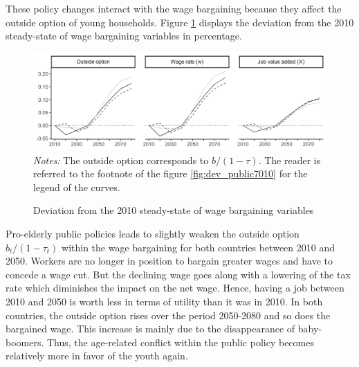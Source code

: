 These policy changes interact with the wage bargaining because they affect the outside option of young households. Figure \ref{fig:dev_bargain1080} displays the deviation from the 2010 steady-state of wage bargaining variables in percentage.
\begin{figure}[!b]
	\centering
	\caption{Deviation from the 2010 steady-state of wage bargaining variables} \label{fig:dev_bargain1080}
	\includegraphics[width=1\linewidth]{../result/deviation/dev_bargain1080.png}
	\vspace{-6ex}
	\justify\singlespacing\footnotesize \textit{Notes:} The outside option corresponds to $b/(1-\tau)$. The reader is referred to the footnote of the figure \ref{fig:dev_public7010} for the legend of the curves.
\end{figure}
Pro-elderly public policies leads to slightly weaken the outside option $b_t/(1-\tau_t)$ within the wage bargaining for both countries between 2010 and 2050. Workers are no longer in position to bargain greater wages and have to concede a wage cut. But the declining wage goes along with a lowering of the tax rate which diminishes the impact on the net wage. Hence, having a job between 2010 and 2050 is worth less in terms of utility than it was in 2010. In both countries, the outside option rises over the period 2050-2080 and so does the bargained wage. This increase is mainly due to the disappearance of baby-boomers. Thus, the age-related conflict within the public policy becomes relatively more in favor of the youth again.

